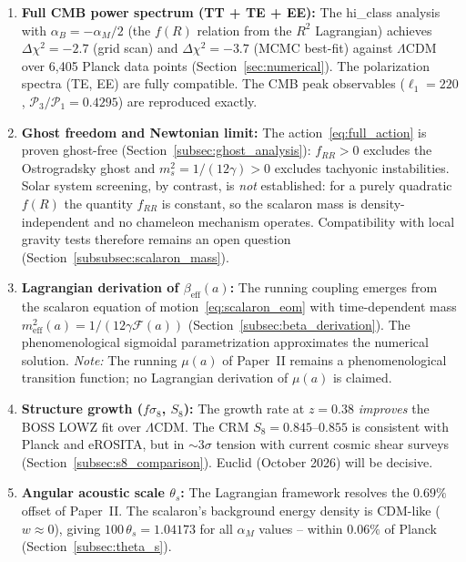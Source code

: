 \documentclass[aps,prd,twocolumn,superscriptaddress,nofootinbib]{revtex4-2}
\begin{document}
\begin{enumerate}
\item \textbf{Full CMB power spectrum (TT + TE + EE):} The hi\_class analysis with $\alpha_B = -\alpha_M/2$ (the $f(R)$ relation from the $R^2$ Lagrangian) achieves $\Delta\chi^2 = -2.7$ (grid scan) and $\Delta\chi^2 = -3.7$ (MCMC best-fit) against $\Lambda$CDM over 6{,}405 Planck data points (Section~\ref{sec:numerical}). The polarization spectra (TE, EE) are fully compatible. The CMB peak observables ($\ell_1 = 220$, $\mathcal{P}_3/\mathcal{P}_1 = 0.4295$) are reproduced exactly.

\item \textbf{Ghost freedom and Newtonian limit:} The action~\eqref{eq:full_action} is proven ghost-free (Section~\ref{subsec:ghost_analysis}): $f_{RR} > 0$ excludes the Ostrogradsky ghost and $m_s^2 = 1/(12\gamma) > 0$ excludes tachyonic instabilities. Solar system screening, by contrast, is \textit{not} established: for a purely quadratic $f(R)$ the quantity $f_{RR}$ is constant, so the scalaron mass is density-independent and no chameleon mechanism operates. Compatibility with local gravity tests therefore remains an open question (Section~\ref{subsubsec:scalaron_mass}).

\item \textbf{Lagrangian derivation of $\beta_{\mathrm{eff}}(a)$:} The running coupling emerges from the scalaron equation of motion~\eqref{eq:scalaron_eom} with time-dependent mass $m_{\mathrm{eff}}^2(a) = 1/(12\gamma\mathcal{F}(a))$ (Section~\ref{subsec:beta_derivation}). The phenomenological sigmoidal parametrization approximates the numerical solution. \textit{Note:} The running $\mu(a)$ of Paper~II remains a phenomenological transition function; no Lagrangian derivation of $\mu(a)$ is claimed.

\item \textbf{Structure growth ($f\sigma_8$, $S_8$):} The growth rate at $z = 0.38$ \textit{improves} the BOSS LOWZ fit over $\Lambda$CDM. The CRM $S_8 = 0.845$--$0.855$ is consistent with Planck and eROSITA, but in $\sim 3\sigma$ tension with current cosmic shear surveys (Section~\ref{subsec:s8_comparison}). Euclid (October 2026) will be decisive.

\item \textbf{Angular acoustic scale $\theta_s$:} The Lagrangian framework resolves the $0.69\%$ offset of Paper~II. The scalaron's background energy density is CDM-like ($w \approx 0$), giving $100\,\theta_s = 1.04173$ for all $\alpha_M$ values -- within $0.06\%$ of Planck (Section~\ref{subsec:theta_s}).


\end{enumerate}
\end{document}
